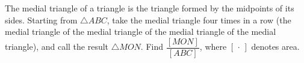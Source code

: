 The medial triangle of a triangle is the triangle formed by the midpoints of its sides. Starting from $\triangle ABC$, take the medial triangle four times in a row (the medial triangle of the medial triangle of the medial triangle of the medial triangle), and call the result $\triangle MON$. Find $\dfrac{[MON]}{[ABC]}$, where $[\,\cdot\,]$ denotes area.
